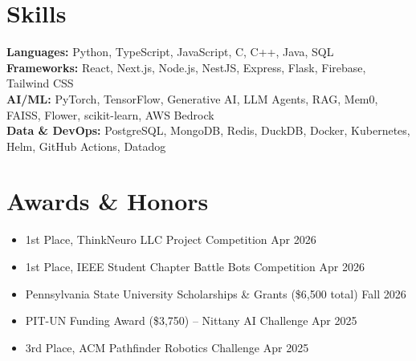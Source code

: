 \documentclass[11pt,a4paper]{article}
\newenvironment{details}{\begin{itemize}[leftmargin=1.4em, label=\textbullet, topsep=0pt, itemsep=0pt, parsep=0pt, partopsep=0pt]}{\end{itemize}}
\begin{document}
\section{Skills}
\textbf{Languages:} Python, TypeScript, JavaScript, C, C++, Java, SQL \\
\textbf{Frameworks:} React, Next.js, Node.js, NestJS, Express, Flask, Firebase, Tailwind CSS \\
\textbf{AI/ML:} PyTorch, TensorFlow, Generative AI, LLM Agents, RAG, Mem0, FAISS, Flower, scikit-learn, AWS Bedrock \\
\textbf{Data \& DevOps:} PostgreSQL, MongoDB, Redis, DuckDB, Docker, Kubernetes, Helm, GitHub Actions, Datadog

\section{Awards \& Honors}
\begin{details}
\item 1st Place, ThinkNeuro LLC Project Competition \hfill Apr 2026
\item 1st Place, IEEE Student Chapter Battle Bots Competition \hfill Apr 2026
\item Pennsylvania State University Scholarships \& Grants (\$6,500 total) \hfill Fall 2026
\item PIT-UN Funding Award (\$3,750) – Nittany AI Challenge \hfill Apr 2025
\item 3rd Place, ACM Pathfinder Robotics Challenge \hfill Apr 2025
\end{details}
\end{document}
